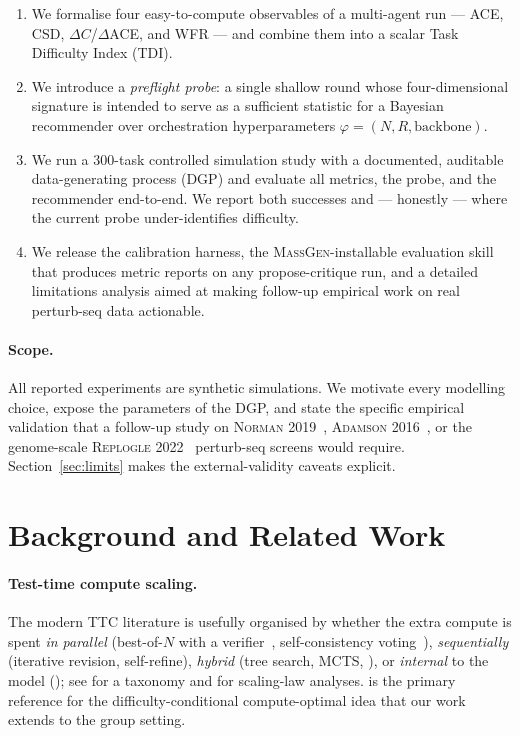 \documentclass[10pt,a4paper]{article}
\begin{document}
\begin{enumerate}[leftmargin=*]
  \item We formalise four easy-to-compute observables of a multi-agent run ---
        ACE, CSD, $\Delta C$/$\Delta$ACE, and WFR --- and combine them into a
        scalar Task Difficulty Index (TDI).
  \item We introduce a \emph{preflight probe}: a single shallow round whose
        four-dimensional signature is intended to serve as a sufficient
        statistic for a Bayesian recommender over orchestration
        hyperparameters $\varphi = (N, R, \textrm{backbone})$.
  \item We run a $300$-task controlled simulation study with a documented,
        auditable data-generating process (DGP) and evaluate all metrics,
        the probe, and the recommender end-to-end. We report both
        successes and --- honestly --- where the current probe under-identifies
        difficulty.
  \item We release the calibration harness, the \textsc{MassGen}-installable
        evaluation skill that produces metric reports on any propose-critique
        run, and a detailed limitations analysis aimed at making follow-up
        empirical work on real perturb-seq data actionable.
\end{enumerate}

\paragraph{Scope.} All reported experiments are synthetic simulations. We
motivate every modelling choice, expose the parameters of the DGP, and state
the specific empirical validation that a follow-up study on
\textsc{Norman 2019}~\citep{norman2019perturbseq},
\textsc{Adamson 2016}~\citep{adamson2016perturbseq}, or the genome-scale
\textsc{Replogle 2022}~\citep{replogle2022perturbseq} perturb-seq screens
would require. Section~\ref{sec:limits} makes the external-validity caveats
explicit.

\section{Background and Related Work}\label{sec:related}

\paragraph{Test-time compute scaling.} The modern TTC literature is usefully
organised by whether the extra compute is spent \emph{in parallel} (best-of-$N$
with a verifier~\citep{cobbe2021verifiers,lightman2024prm}, self-consistency
voting~\citep{wang2023selfconsistency}), \emph{sequentially} (iterative
revision, self-refine), \emph{hybrid} (tree search, MCTS,
\citep{yao2023tot}), or \emph{internal} to the model
(\citep{deepseek2025r1,muennighoff2025s1}); see \citet{zhang2025ttssurvey} for
a taxonomy and \citet{wu2024smalltllm,liu2025rethinkingtts} for scaling-law
analyses. \citet{snell2024scaling} is the primary reference for the
difficulty-conditional compute-optimal idea that our work extends to the
group setting.
\end{document}
